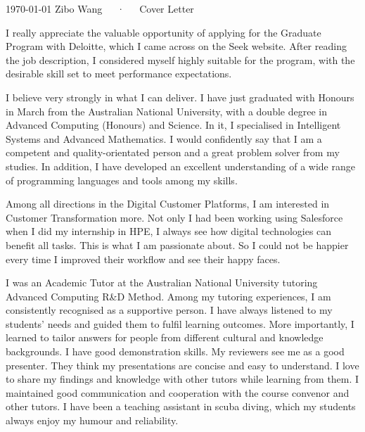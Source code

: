 \documentclass[11pt, a4paper]{awesome-cv}
\begin{document}
\makecvheader[R]

\makecvfooter
  {\today}
  {Zibo Wang~~~·~~~Cover Letter}
  {}

\makelettertitle

\begin{cvletter}

I really appreciate the valuable opportunity of applying for the Graduate Program with Deloitte, which I came across on the Seek website. After reading the job description, I considered myself highly suitable for the program, with the desirable skill set to meet performance expectations.


I believe very strongly in what I can deliver. I have just graduated with Honours in March from the Australian National University, with a double degree in Advanced Computing (Honours) and Science. In it, I specialised in Intelligent Systems and Advanced Mathematics. I would confidently say that I am a competent and quality-orientated person and a great problem solver from my studies. In addition, I have developed an excellent understanding of a wide range of programming languages and tools among my skills.

Among all directions in the Digital Customer Platforms, I am interested in Customer Transformation more. Not only I had been working using Salesforce when I did my internship in HPE, I always see how digital technologies can benefit all tasks. This is what I am passionate about. So I could not be happier every time I improved their workflow and see their happy faces.

I was an Academic Tutor at the Australian National University tutoring Advanced Computing R\&D Method. Among my tutoring experiences, I am consistently recognised as a supportive person. I have always listened to my students' needs and guided them to fulfil learning outcomes. More importantly, I learned to tailor answers for people from different cultural and knowledge backgrounds. I have good demonstration skills. My reviewers see me as a good presenter. They think my presentations are concise and easy to understand. I love to share my findings and knowledge with other tutors while learning from them. I maintained good communication and cooperation with the course convenor and other tutors. I have been a teaching assistant in scuba diving, which my students always enjoy my humour and reliability.


\end{cvletter}
\end{document}
